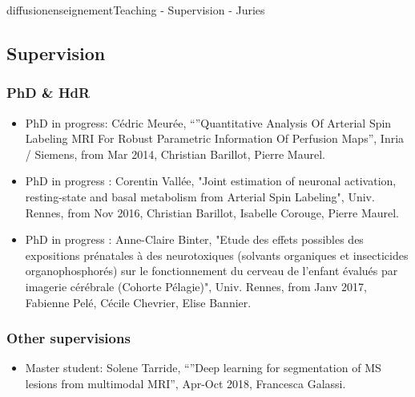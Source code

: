 \documentclass{ra2018}
\begin{document}
\begin{module}{diffusion}{enseignement}{Teaching - Supervision - Juries}

\subsection {Supervision}

 \subsubsection{PhD \& HdR}
 \begin{itemize}
           \item PhD in progress: Cédric Meurée, ``''Quantitative Analysis Of Arterial Spin Labeling MRI For Robust Parametric Information Of Perfusion Maps'', Inria / Siemens, from Mar 2014, Christian Barillot, Pierre Maurel.
           \item PhD in progress : Corentin Vallée, "Joint estimation of neuronal activation, resting-state and basal metabolism from Arterial Spin Labeling", Univ. Rennes, from Nov 2016, Christian Barillot, Isabelle Corouge, Pierre Maurel.
           \item PhD in progress : Anne-Claire Binter, "Etude des effets possibles des expositions prénatales à des neurotoxiques (solvants organiques et insecticides organophosphorés) sur le fonctionnement du cerveau de l’enfant évalués par imagerie cérébrale (Cohorte Pélagie)", Univ. Rennes, from Janv 2017, Fabienne Pelé, Cécile Chevrier, Elise Bannier.
  \end{itemize}

  \subsubsection{Other supervisions}
  \begin{itemize}
           \item Master student: Solene Tarride, ``''Deep learning for segmentation of MS lesions from multimodal MRI'', Apr-Oct 2018, Francesca Galassi.
  \end{itemize}


\end{module}
\end{document}
